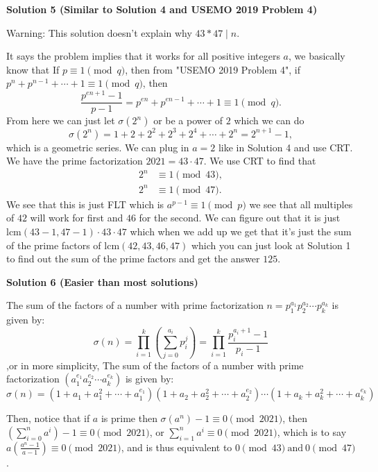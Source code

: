 \begin{enumerate}
 



\textbf{Solution 5 (Similar to Solution 4 and USEMO 2019 Problem 4)}

Warning: This solution doesn't explain why $43*47\mid n$.

 It says the problem implies that it works for all positive integers $a$, we basically know that If $p \equiv 1 \pmod q$, then from "USEMO 2019 Problem 4", if $p^n + p^{n-1} + \cdots + 1 \equiv 1 \pmod{q}$, then 
 \[\frac{p^{en+1}-1}{p-1} = p^{en} + p^{en-1} + \cdots + 1 \equiv 1 \pmod{q}.\] From here we can just let $\sigma(2^n)$ or be a power of $2$ which we can do 
 \[\sigma(2^n)=1+2+2^2+2^3+2^4+\cdots+2^n=2^{n+1}-1,\] which is a geometric series. We can plug in $a=2$ like in Solution 4 and use CRT. We have the prime factorization $2021 = 43 \cdot 47$. We use CRT to find that 
 \begin{align*} 2^n &\equiv 1 \pmod{43}, \\ 2^n &\equiv 1 \pmod{47}. \end{align*}
 We see that this is just FLT which is $a^{p-1} \equiv 1 \pmod p$ we see that all multiples of $42$ will work for first and $46$ for the second. We can figure out that it is just $\text{lcm}(43-1,47-1)\cdot43\cdot47$ which when we add up we get that it's just the sum of the prime factors of $\text{lcm}(42,43,46,47)$ which you can just look at Solution 1 to find out the sum of the prime factors and get the answer $\boxed{125}$.

 



\textbf{Solution 6 (Easier than most solutions)}

The sum of the factors of a number with prime factorization $n = p_1^{a_1} p_2^{a_2} \cdots p_k^{a_k}$ is given by:
 \[\sigma(n) = \prod_{i=1}^k \left( \sum_{j=0}^{a_i} p_i^j \right) = \prod_{i=1}^k \frac{p_i^{a_i+1} - 1}{p_i - 1}\],or in more simplicity, The sum of the factors of a number with prime factorization \( (a_1^{e_1} a_2^{e_2} \cdots a_k^{e_k}) \) is given by:
 \[\sigma(n) = (1 + a_1 + a_1^2 + \cdots + a_1^{e_1}) (1 + a_2 + a_2^2 + \cdots + a_2^{e_2}) \cdots (1 + a_k + a_k^2 + \cdots + a_k^{e_k})\]

 Then, notice that if $a$ is prime then $\sigma(a^n) - 1 \equiv 0 \pmod{2021}$, then $(\sum_{i=0}^{n} a^i) - 1 \equiv 0 \pmod{2021}$, or $\sum_{i=1}^{n} a^i \equiv 0 \pmod{2021}$, which is to say $a\left(\frac{a^n - 1}{a - 1}\right) \equiv 0 \pmod{2021}$, and is thus equivalent to $0 \pmod{43}~\text{and}~ 0 \pmod{47}$.


\end{enumerate}
